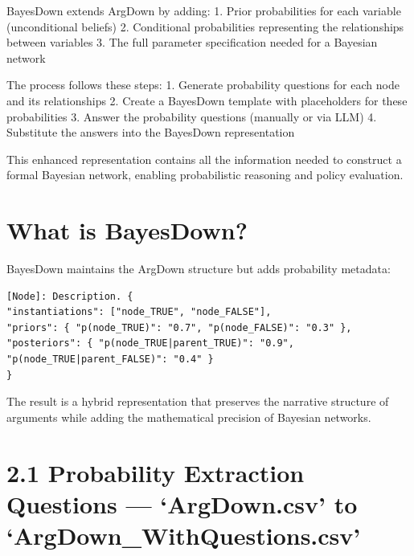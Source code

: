 \documentclass[
  11pt,
  letterpaper,
]{book}
\begin{document}
BayesDown extends ArgDown by adding: 1. Prior probabilities for each
variable (unconditional beliefs) 2. Conditional probabilities
representing the relationships between variables 3. The full parameter
specification needed for a Bayesian network

The process follows these steps: 1. Generate probability questions for
each node and its relationships 2. Create a BayesDown template with
placeholders for these probabilities 3. Answer the probability questions
(manually or via LLM) 4. Substitute the answers into the BayesDown
representation

This enhanced representation contains all the information needed to
construct a formal Bayesian network, enabling probabilistic reasoning
and policy evaluation.

\section{What is BayesDown?}\label{what-is-bayesdown}

BayesDown maintains the ArgDown structure but adds probability metadata:

\begin{verbatim}
[Node]: Description. {
"instantiations": ["node_TRUE", "node_FALSE"],
"priors": { "p(node_TRUE)": "0.7", "p(node_FALSE)": "0.3" },
"posteriors": { "p(node_TRUE|parent_TRUE)": "0.9", "p(node_TRUE|parent_FALSE)": "0.4" }
}
\end{verbatim}

The result is a hybrid representation that preserves the narrative
structure of arguments while adding the mathematical precision of
Bayesian networks.

\section{2.1 Probability Extraction Questions --- `ArgDown.csv' to
`ArgDown\_WithQuestions.csv'}\label{probability-extraction-questions-argdown.csv-to-argdown_withquestions.csv}
\end{document}
